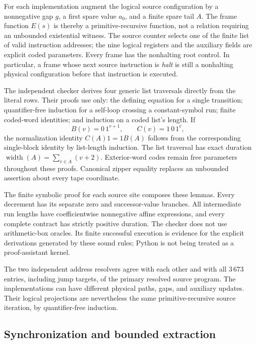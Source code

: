 For each implementation augment the logical source configuration by a
nonnegative gap $g$, a first spare value $a_0$, and a finite spare tail
$A$.  The frame function $E(s)$ is thereby a primitive-recursive function,
not a relation requiring an unbounded existential witness.  The source
counter selects one of the finite list of valid instruction addresses;
the nine logical registers and the auxiliary fields are explicit coded
parameters.  Every frame has the nonhalting root control.  In particular,
a frame whose next source instruction is \emph{halt} is still a
nonhalting physical configuration before that instruction is executed.

The independent checker derives four generic list traversals directly
from the literal rows.  Their proofs use only: the defining equation for a
single transition; quantifier-free induction for a self-loop crossing a
constant-symbol run; finite coded-word identities; and induction on a
coded list's length.  If
\[
 B(v)=0\,1^{v+1},\qquad C(v)=1\,0\,1^v,
\]
the normalization identity $C(A)1=1B(A)$ follows from the corresponding
single-block identity by list-length induction.  The list traversal has
exact duration $\operatorname{width}(A)=\sum_{v\in A}(v+2)$.
Exterior-word codes remain free parameters throughout these proofs.
Canonical zipper equality replaces an unbounded assertion about every
tape coordinate.

The finite symbolic proof for each source site composes these lemmas.
Every decrement has its separate zero and successor-value branches.
All intermediate run lengths have coefficientwise nonnegative affine
expressions, and every complete contract has strictly positive duration.
The checker does not use arithmetic-box oracles.  Its finite successful
execution is evidence for the explicit derivations generated by these
sound rules; Python is not being treated as a proof-assistant kernel.

The two independent address resolvers agree with each other and with all
$3\,673$ entries, including jump targets, of the primary resolved source
program.  The implementations can have different physical paths, gaps,
and auxiliary updates.  Their logical projections are nevertheless the
same primitive-recursive source iteration, by quantifier-free induction.

\subsection{Synchronization and bounded extraction}

